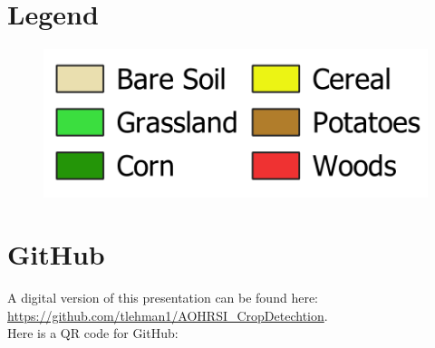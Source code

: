 \documentclass[
  t,%
]{_style/tudelft-beamerposter}
\begin{document}
\begin{frame}
\begin{columns}[onlytextwidth, T]
\begin{column}{}
      \section*{Legend}
      \begin{figure}
        \centering
        \includegraphics[width=1\linewidth]{graphs/legend.png}
        \label{fig:legend}
      \end{figure}

     
  
      \AtNextBibliography{\normalsize}%
      \printbibliography

      \vspace{1cm}
        
      \section*{GitHub}
      \justifying
        A digital version of this presentation can be found here:
      \url{https://github.com/tlehman1/AOHRSI_CropDetechtion}.
      \\ Here is a QR code for GitHub:
  
      \begin{center}
      \end{center}
    \end{column}
  \end{columns}
\end{frame}
\end{document}
